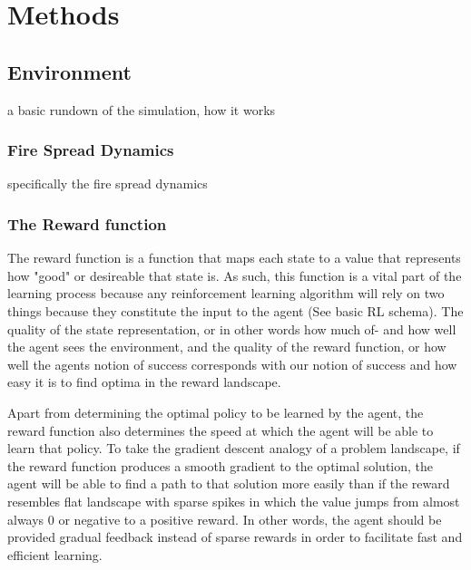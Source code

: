 \section{Methods}\label{sec:methods}

\subsection{Environment}\label{sec:environment}
a basic rundown of the simulation, how it works

\subsubsection{Fire Spread Dynamics}\label{sec:fire_spread}
specifically the fire spread dynamics

\subsubsection{The Reward function}\label{sec:reward_function}
The reward function is a function that maps each state to a value that represents how "good" or desireable that state is. As such, this function is a vital part of the learning process because any reinforcement learning algorithm will rely on two things because they constitute the input to the agent (See basic RL schema). The quality of the state representation, or in other words how much of- and how well the agent sees the environment, and the quality of the reward function, or how well the agents notion of success corresponds with our notion of success and how easy it is to find optima in the reward landscape.

Apart from determining the optimal policy to be learned by the agent, the reward function also determines the speed at which the agent will be able to learn that policy. To take the gradient descent analogy of a problem landscape, if the reward function produces a smooth gradient to the optimal solution, the agent will be able to find a path to that solution more easily than if the reward resembles flat landscape with sparse spikes in which the value jumps from almost always 0 or negative to a positive reward. In other words, the agent should be provided gradual feedback instead of sparse rewards in order to facilitate fast and efficient learning.


